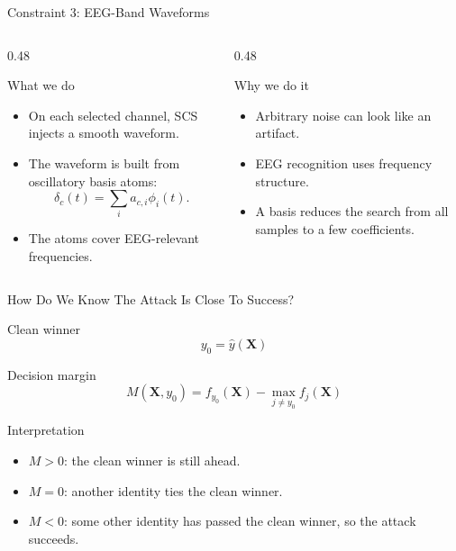 \documentclass[aspectratio=169,11pt]{beamer}
\newcommand{\whatwhy}[2]{%
\begin{columns}[T,onlytextwidth]
  \begin{column}{0.48\textwidth}
    \begin{block}{What we do}
      #1
    \end{block}
  \end{column}
  \begin{column}{0.48\textwidth}
    \begin{block}{Why we do it}
      #2
    \end{block}
  \end{column}
\end{columns}
}
\begin{document}
\begin{frame}{Constraint 3: EEG-Band Waveforms}
\whatwhy{
\begin{itemize}
  \item On each selected channel, SCS injects a smooth waveform.
  \item The waveform is built from oscillatory basis atoms:
  \[
  \delta_c(t)=\sum_i a_{c,i}\phi_i(t).
  \]
  \item The atoms cover EEG-relevant frequencies.
\end{itemize}
}{
\begin{itemize}
  \item Arbitrary noise can look like an artifact.
  \item EEG recognition uses frequency structure.
  \item A basis reduces the search from all samples to a few coefficients.
\end{itemize}
}
\end{frame}

\begin{frame}{How Do We Know The Attack Is Close To Success?}
\begin{block}{Clean winner}
\[
y_0=\hat{y}(\mathbf{X})
\]
\end{block}

\begin{block}{Decision margin}
\[
M(\mathbf{X},y_0)=f_{y_0}(\mathbf{X})-\max_{j\neq y_0}f_j(\mathbf{X})
\]
\end{block}

\begin{block}{Interpretation}
\begin{itemize}
  \item \(M>0\): the clean winner is still ahead.
  \item \(M=0\): another identity ties the clean winner.
  \item \(M<0\): some other identity has passed the clean winner, so the attack succeeds.
\end{itemize}
\end{block}
\end{frame}
\end{document}
